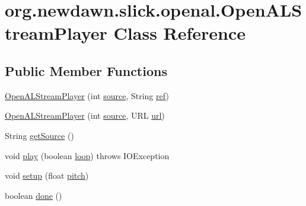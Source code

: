 \hypertarget{classorg_1_1newdawn_1_1slick_1_1openal_1_1_open_a_l_stream_player}{}\section{org.\+newdawn.\+slick.\+openal.\+Open\+A\+L\+Stream\+Player Class Reference}
\label{classorg_1_1newdawn_1_1slick_1_1openal_1_1_open_a_l_stream_player}
\subsection*{Public Member Functions}
\begin{DoxyCompactItemize}
\item 
\mbox{\hyperlink{classorg_1_1newdawn_1_1slick_1_1openal_1_1_open_a_l_stream_player_af1d0e6ffda79b5da70fb520231954be5}{Open\+A\+L\+Stream\+Player}} (int \mbox{\hyperlink{classorg_1_1newdawn_1_1slick_1_1openal_1_1_open_a_l_stream_player_abe9f7d1ac52a705aa359cf3eb1c69464}{source}}, String \mbox{\hyperlink{classorg_1_1newdawn_1_1slick_1_1openal_1_1_open_a_l_stream_player_ab01c1f73849aaeae84d969cbd05d4683}{ref}})
\item 
\mbox{\hyperlink{classorg_1_1newdawn_1_1slick_1_1openal_1_1_open_a_l_stream_player_a8ad9837700d6ade18caa42643c96c916}{Open\+A\+L\+Stream\+Player}} (int \mbox{\hyperlink{classorg_1_1newdawn_1_1slick_1_1openal_1_1_open_a_l_stream_player_abe9f7d1ac52a705aa359cf3eb1c69464}{source}}, U\+RL \mbox{\hyperlink{classorg_1_1newdawn_1_1slick_1_1openal_1_1_open_a_l_stream_player_a2f903c9bc54f0a1d739ad917a8aa97f6}{url}})
\item 
String \mbox{\hyperlink{classorg_1_1newdawn_1_1slick_1_1openal_1_1_open_a_l_stream_player_ac995066157d65c9191cbdb7ef2c0d2f4}{get\+Source}} ()
\item 
void \mbox{\hyperlink{classorg_1_1newdawn_1_1slick_1_1openal_1_1_open_a_l_stream_player_a6b07841e79d68f51bbc8fd33527e296a}{play}} (boolean \mbox{\hyperlink{classorg_1_1newdawn_1_1slick_1_1openal_1_1_open_a_l_stream_player_a377b3e28ef63fca0134898a07b086e7f}{loop}})  throws I\+O\+Exception 
\item 
void \mbox{\hyperlink{classorg_1_1newdawn_1_1slick_1_1openal_1_1_open_a_l_stream_player_a7bfabcfeaa56d6561604d3936d9d1a51}{setup}} (float \mbox{\hyperlink{classorg_1_1newdawn_1_1slick_1_1openal_1_1_open_a_l_stream_player_a3841668c39ff3eccf93978ee5ca7bc3e}{pitch}})
\item 
boolean \mbox{\hyperlink{classorg_1_1newdawn_1_1slick_1_1openal_1_1_open_a_l_stream_player_a64962f56b4c366c19fe3c2bff2f55842}{done}} ()

\end{DoxyCompactItemize}

